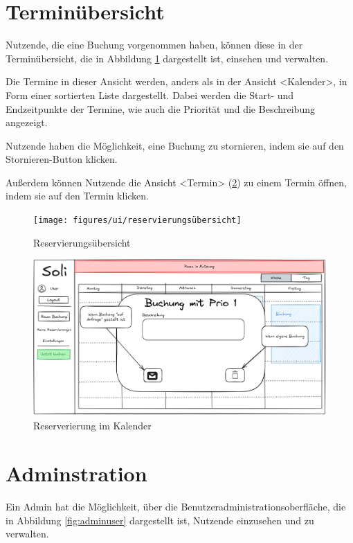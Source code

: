 \section{Terminübersicht}
Nutzende, die eine Buchung vorgenommen haben, können diese in der Terminübersicht,
die in Abbildung \ref{fig:overview} dargestellt ist, einsehen und verwalten.

Die Termine in dieser Ansicht werden, anders als in der Ansicht <Kalender>, in Form einer sortierten Liste dargestellt.
Dabei werden die Start- und Endzeitpunkte der Termine, wie auch die Priorität und die Beschreibung angezeigt.

Nutzende haben die Möglichkeit, eine Buchung zu stornieren, indem sie auf den Stornieren-Button klicken.

Außerdem können Nutzende die Ansicht <Termin> (\ref{fig:calendarviewbooking}) zu einem Termin öffnen, indem sie auf den Termin klicken.

\begin{figure}[ht]
    \texttt{[image: figures/ui/reservierungsübersicht]}
    \caption{Reservierungsübersicht}
    \label{fig:overview}
\end{figure}
\begin{figure}
    \centering
    \includegraphics[width=\textwidth]{figures/ui/reservierunginkalendar}
    \caption{Reserverierung im Kalender}
    \label{fig:calendarviewbooking}
\end{figure}
\clearpage

\section{Adminstration}
Ein Admin hat die Möglichkeit, über die Benutzeradministrationsoberfläche, die in Abbildung \ref{fig:adminuser} dargestellt ist, Nutzende einzusehen und zu verwalten.

